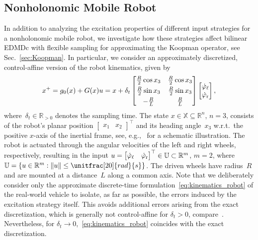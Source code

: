 \documentclass[a4paper, reqno]{amsart}
\begin{document}
\subsection{Nonholonomic Mobile Robot}
In addition to analyzing the excitation properties of different input strategies for a nonholonomic mobile robot, we investigate how these strategies affect bilinear EDMDc with flexible sampling for approximating the Koopman operator, see Sec.~\ref{sec:Koopman}.
%
In particular, we consider an approximately discretized, control-affine version of the robot kinematics, given by
\begin{align}\label{eq:kinematics_robot}
    x^+ = g_0 (x) + G(x) u = x + \delta_t \begin{bmatrix} \frac{R}{2} \cos x_3 & \frac{R}{2} \cos x_3 \\[3pt] \frac{R}{2} \sin x_3 & \frac{R}{2} \sin x_3 \\[3pt] -\frac{R}{L} & \frac{R}{L}    \end{bmatrix} \begin{bmatrix} \dot{\varphi}_{\ell} \\ \dot{\varphi}_{\textnormal{r}} \end{bmatrix},
\end{align}
where~$\delta_t\in\mathbb{R}_{>0}$ denotes the sampling time.
The state $x\in\mathbb{X} \subseteq \mathbb{R}^n$, $n=3$, 
consists of the robot's planar position $\begin{bmatrix}x_1 & x_2\end{bmatrix}^\top$ and its heading angle~$x_3$ w.r.t.\ the positive $x$-axis of the inertial frame, see, e.g.,~\cite{rose25Koopman} for a schematic illustration.
The robot is actuated through the angular velocities of the left and right wheels, respectively, resulting in the input $u=\begin{bmatrix} \dot{\varphi}_\ell & \dot{\varphi}_{\textnormal{r}}\end{bmatrix}^\top \in\mathbb{U}\subset \mathbb{R}^m$, $m=2$, where $\mathbb{U}=\left\lbrace u\in\mathbb{R}^m  : \| u \| \leq \unitfrac[20]{rad}{s} \right\rbrace$.
The driven wheels have radius~$R$ and are mounted at a distance~$L$ along a common axis.
%
Note that we deliberately consider only the approximate discrete-time formulation~\eqref{eq:kinematics_robot} of the real-world vehicle to isolate, as far as possible, the errors induced by the excitation strategy itself.
This avoids additional errors arising from the exact discretization, which is generally not control-affine for $\delta_t > 0$, compare~\cite{worth2015nonhol}.
Nevertheless, for $\delta_t \to 0$,~\eqref{eq:kinematics_robot} coincides with the exact discretization.
\end{document}
